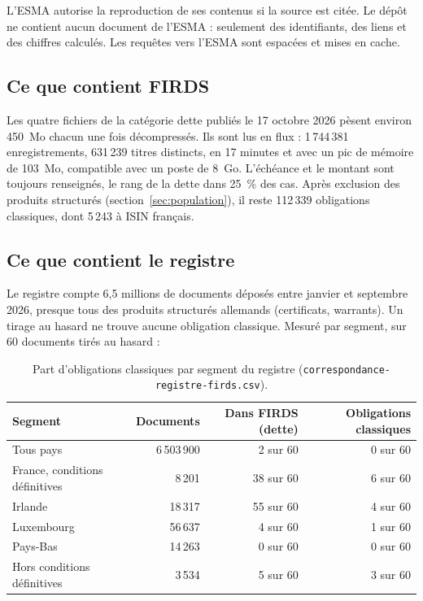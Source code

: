 \documentclass[11pt,a4paper]{article}
\begin{document}
L'ESMA autorise la reproduction de ses contenus si la source est citée. Le dépôt ne contient aucun document de l'ESMA : seulement des identifiants, des liens et des chiffres calculés. Les requêtes vers l'ESMA sont espacées et mises en cache.

\subsection{Ce que contient FIRDS}

Les quatre fichiers de la catégorie dette publiés le 17 octobre 2026 pèsent environ 450~Mo chacun une fois décompressés. Ils sont lus en flux : 1\,744\,381 enregistrements, 631\,239 titres distincts, en 17 minutes et avec un pic de mémoire de 103~Mo, compatible avec un poste de 8~Go. L'échéance et le montant sont toujours renseignés, le rang de la dette dans 25~\% des cas. Après exclusion des produits structurés (section~\ref{sec:population}), il reste 112\,339 obligations classiques, dont 5\,243 à ISIN français.

\subsection{Ce que contient le registre}

Le registre compte 6,5 millions de documents déposés entre janvier et septembre 2026, presque tous des produits structurés allemands (certificats, warrants). Un tirage au hasard ne trouve aucune obligation classique. Mesuré par segment, sur 60 documents tirés au hasard :

\begin{table}[H]
\small
\begin{tabularx}{\linewidth}{Yrrr}
\toprule
\textbf{Segment} & \textbf{Documents} & \textbf{Dans FIRDS (dette)} & \textbf{Obligations classiques} \\
\midrule
Tous pays & 6\,503\,900 & 2 sur 60 & 0 sur 60 \\
France, conditions définitives & 8\,201 & 38 sur 60 & 6 sur 60 \\
Irlande & 18\,317 & 55 sur 60 & 4 sur 60 \\
Luxembourg & 56\,637 & 4 sur 60 & 1 sur 60 \\
Pays-Bas & 14\,263 & 0 sur 60 & 0 sur 60 \\
Hors conditions définitives & 3\,534 & 5 sur 60 & 3 sur 60 \\
\bottomrule
\end{tabularx}
\caption{Part d'obligations classiques par segment du registre (\texttt{correspondance-registre-firds.csv}).}
\end{table}
\end{document}
